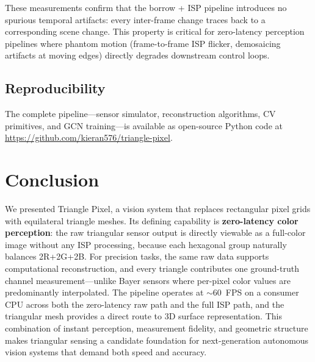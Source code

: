 \documentclass[10pt,twocolumn,letterpaper]{article}
\begin{document}
These measurements confirm that the borrow + ISP pipeline introduces no spurious temporal artifacts: every inter-frame change traces back to a corresponding scene change. This property is critical for zero-latency perception pipelines where phantom motion (frame-to-frame ISP flicker, demosaicing artifacts at moving edges) directly degrades downstream control loops.

\subsection{Reproducibility}
The complete pipeline---sensor simulator, reconstruction algorithms, CV primitives, and GCN training---is available as open-source Python code at \url{https://github.com/kieran576/triangle-pixel}.

\section{Conclusion}

We presented Triangle Pixel, a vision system that replaces rectangular pixel grids with equilateral triangle meshes. Its defining capability is \textbf{zero-latency color perception}: the raw triangular sensor output is directly viewable as a full-color image without any ISP processing, because each hexagonal group naturally balances 2R+2G+2B. For precision tasks, the same raw data supports computational reconstruction, and every triangle contributes one ground-truth channel measurement---unlike Bayer sensors where per-pixel color values are predominantly interpolated. The pipeline operates at $\sim$60~FPS on a consumer CPU across both the zero-latency raw path and the full ISP path, and the triangular mesh provides a direct route to 3D surface representation. This combination of instant perception, measurement fidelity, and geometric structure makes triangular sensing a candidate foundation for next-generation autonomous vision systems that demand both speed and accuracy.
\end{document}

